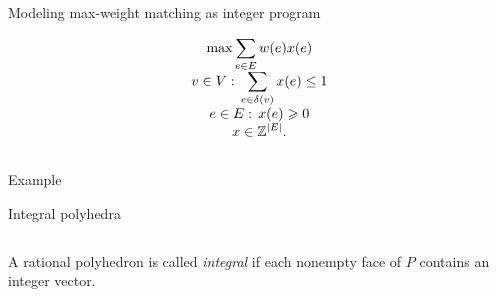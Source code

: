 \begin{frame}{Modeling max-weight matching as integer program} 


  \begin{equation*}
  \label{eq:45}
  \begin{array}{c}\displaystyle 
    \max \sum_{e \in E} w(e) x(e) \\
    \displaystyle 
    v \in V: \, \sum_{e \in \delta(v)} x(e)\leq1 \\
    \displaystyle 
    e \in E:\,  x(e)  \geqslant0 \\
    \displaystyle 
    x \in \mathbb{Z}^{|E|}.
  \end{array}
\end{equation*}

   \begin{columns}
    \begin{column}{.5\textwidth}
      
    \end{column}
    \begin{column}{.5\textwidth}
      
    \end{column}       
  \end{columns}
\end{frame}



\begin{frame}{Example} 
  
\end{frame}



\begin{frame}{Integral polyhedra}

  




   \begin{columns}
    \begin{column}{.5\textwidth}
      \begin{definition}
  \label{def:12}  
  A rational polyhedron   is called \emph{integral} 
  if  each nonempty face of $P$ contains an integer vector. 
\end{definition}
    \end{column}
    \begin{column}{.5\textwidth}
      
    \end{column}       
  \end{columns}
\end{frame}





